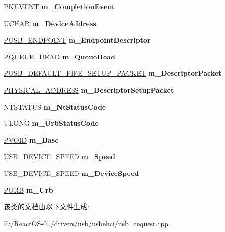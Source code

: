 \begin{DoxyCompactItemize}
\hyperlink{struct___k_e_v_e_n_t}{P\+K\+E\+V\+E\+NT} {\bfseries m\+\_\+\+Completion\+Event}
\item 
\mbox{\label{class_c_u_s_b_request_a03db5b6551dba6fbfcec0ab4b40d508d}} 
U\+C\+H\+AR {\bfseries m\+\_\+\+Device\+Address}
\item 
\mbox{\label{class_c_u_s_b_request_a37cf22e059ec751857101e8847eb17f3}} 
\hyperlink{struct___u_s_b___e_n_d_p_o_i_n_t}{P\+U\+S\+B\+\_\+\+E\+N\+D\+P\+O\+I\+NT} {\bfseries m\+\_\+\+Endpoint\+Descriptor}
\item 
\mbox{\label{class_c_u_s_b_request_a3c63938a90a3f42fe99646ef1bbe4357}} 
\hyperlink{struct___q_u_e_u_e___h_e_a_d}{P\+Q\+U\+E\+U\+E\+\_\+\+H\+E\+AD} {\bfseries m\+\_\+\+Queue\+Head}
\item 
\mbox{\label{class_c_u_s_b_request_a29cbc92b70931f1608aa86f99ad3b6c1}} 
\hyperlink{struct___u_s_b___d_e_f_a_u_l_t___p_i_p_e___s_e_t_u_p___p_a_c_k_e_t}{P\+U\+S\+B\+\_\+\+D\+E\+F\+A\+U\+L\+T\+\_\+\+P\+I\+P\+E\+\_\+\+S\+E\+T\+U\+P\+\_\+\+P\+A\+C\+K\+ET} {\bfseries m\+\_\+\+Descriptor\+Packet}
\item 
\mbox{\label{class_c_u_s_b_request_a81db7dc48789587b26f11d1baefd6ddf}} 
\hyperlink{union___l_a_r_g_e___i_n_t_e_g_e_r}{P\+H\+Y\+S\+I\+C\+A\+L\+\_\+\+A\+D\+D\+R\+E\+SS} {\bfseries m\+\_\+\+Descriptor\+Setup\+Packet}
\item 
\mbox{\label{class_c_u_s_b_request_a897512f36a0bed1fada77e5d97de2bf1}} 
N\+T\+S\+T\+A\+T\+US {\bfseries m\+\_\+\+Nt\+Status\+Code}
\item 
\mbox{\label{class_c_u_s_b_request_a5da9e3d64b4f0997c1be9184910794ac}} 
U\+L\+O\+NG {\bfseries m\+\_\+\+Urb\+Status\+Code}
\item 
\mbox{\label{class_c_u_s_b_request_ad9b39fa70bf048bff8be693fd6f3958a}} 
\hyperlink{interfacevoid}{P\+V\+O\+ID} {\bfseries m\+\_\+\+Base}
\item 
\mbox{\label{class_c_u_s_b_request_a1dda5c82551f3b96319eaa38f895cc66}} 
U\+S\+B\+\_\+\+D\+E\+V\+I\+C\+E\+\_\+\+S\+P\+E\+ED {\bfseries m\+\_\+\+Speed}
\item 
\mbox{\label{class_c_u_s_b_request_aaf761265e7fb1d1fb3cf39b120f7c0b6}} 
U\+S\+B\+\_\+\+D\+E\+V\+I\+C\+E\+\_\+\+S\+P\+E\+ED {\bfseries m\+\_\+\+Device\+Speed}
\item 
\mbox{\label{class_c_u_s_b_request_a4b513a506b0aa837e516bf8456dea36e}} 
\hyperlink{struct___u_r_b}{P\+U\+RB} {\bfseries m\+\_\+\+Urb}
\end{DoxyCompactItemize}


该类的文档由以下文件生成\+:\begin{DoxyCompactItemize}
\item 
E\+:/\+React\+O\+S-\/0../drivers/usb/usbehci/usb\+\_\+request.\+cpp\end{DoxyCompactItemize}

